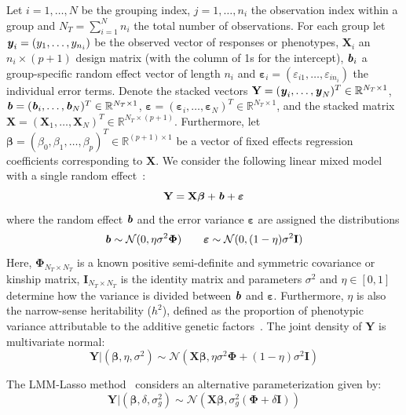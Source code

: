 \documentclass[12pt,letter]{article}\usepackage[]{graphicx}\usepackage[]{color}
\newcommand{\by}{\textbf{\emph{y}}}
\newcommand{\bX}{\textbf{X}}
\newcommand{\bY}{\textbf{Y}}
\newcommand{\bb}{\textbf{\emph{b}}}
\newcommand{\bI}{\textbf{I}}
\newcommand{\be}{\boldsymbol{\varepsilon}}
\newcommand{\bbeta}{\boldsymbol{\beta}}
\newcommand{\bPhi}{\boldsymbol{\Phi}}
\begin{document}
Let $i = 1, \ldots, N$ be the grouping index, $j = 1, \ldots, n_i$ the observation index within a group and $N_T = \sum_{i=1}^{N} n_i$ the total number of observations. For each group let \mbox{$\by_i = (y_1, \ldots, y_{n_i})$} be the observed vector of responses or phenotypes, $\bX_i$ an $n_i \times (p + 1)$ design matrix (with the column of 1s for the intercept), $\bb_i$ a group-specific random effect vector of length $n_i$ and \mbox{$\be_i = (\varepsilon_{i1}, \ldots, \varepsilon_{in_i})$} the individual error terms. Denote the stacked vectors \mbox{$\bY = (\by_i, \ldots, \by_N)^T \in \mathbb{R}^{N_T \times 1}$}, $\bb = (\bb_i, \ldots, \bb_N)^T \in \mathbb{R}^{N_T \times 1}$, \mbox{$\be = (\be_i, \ldots, \be_N)^T \in \mathbb{R}^{N_T \times 1}$}, and the stacked matrix \\\mbox{$\bX = (\bX_1, \ldots, \bX_N)^T \in \mathbb{R}^{N_T \times (p + 1)}$}. Furthermore, let $\bbeta = (\beta_0,\beta_1, \ldots, \beta_p)^T \in \mathbb{R}^{(p+1) \times 1}$ be a vector of fixed effects regression coefficients corresponding to $\bX$. We consider the following linear mixed model with a single random effect~\citep{pirinen2013efficient}:
\begin{equation}
	\bY = \bX \bbeta + \bb + \be
\end{equation}
where the random effect $\bb$ and the error variance $\be$ are assigned the distributions
\begin{equation}
	\bb \sim \mathcal{N}(0, \eta \sigma^2 \bPhi) \qquad \be \sim \mathcal{N}(0, (1-\eta)\sigma^2 \bI)
\end{equation}
Here, $\bPhi_{N_T \times N_T}$ is a known positive semi-definite and symmetric covariance or kinship matrix, $\bI_{N_T \times N_T}$ is the identity matrix and parameters $\sigma^2$ and $\eta \in [0,1]$ determine how the variance is divided between $\bb$ and $\be$. Furthermore, $\eta$ is also the narrow-sense heritability ($h^2$), defined as the proportion of phenotypic variance attributable to the additive genetic factors~\citep{manolio2009finding}. The joint density of $\bY$ is multivariate normal:
\begin{equation}
	\bY | (\bbeta, \eta, \sigma^2) \sim \mathcal{N}(\bX \bbeta, \eta \sigma^2 \bPhi + (1-\eta)\sigma^2 \bI) \label{eq:prinen}
\end{equation}

The LMM-Lasso method~\citep{rakitsch2013lasso} considers an alternative parameterization given by:
\begin{equation}
	\bY | (\bbeta, \delta, \sigma_g^2) \sim \mathcal{N}(\bX \bbeta, \sigma_g^2(\bPhi + \delta\bI)) \label{eq:lippert}
\end{equation}
\end{document}
